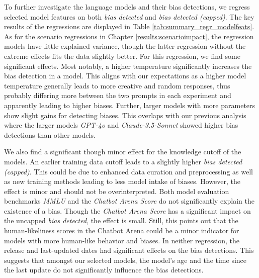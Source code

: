 \par To further investigate the language models and their bias detections, we regress selected model features on both \textit{bias detected} and \textit{bias detected (capped)}. The key results of the regressions are displayed in Table \ref{tab:summary_regr_modelfeats}. As for the scenario regressions in Chapter \ref{results:scenarioimpact}, the regression models have little explained variance, though the latter regression without the extreme effects fits the data slightly better. For this regression, we find some significant effects. Most notably, a higher temperature significantly increases the bias detection in a model. This aligns with our expectations as a higher model temperature generally leads to more creative and random responses, thus probably differing more between the two prompts in each experiment and apparently leading to higher biases. Further, larger models with more parameters show slight gains for detecting biases. This overlaps with our previous analysis where the larger models \textit{GPT-4o} and \textit{Claude-3.5-Sonnet} showed higher bias detections than other models.

\par We also find a significant though minor effect for the knowledge cutoff of the models. An earlier training data cutoff leads to a slightly higher \textit{bias detected (capped)}. This could be due to enhanced data curation and preprocessing as well as new training methods leading to less model intake of biases. However, the effect is minor and should not be overinterpreted. Both model evaluation benchmarks \textit{MMLU} and the \textit{Chatbot Arena Score} do not significantly explain the existence of a bias. Though the \textit{Chatbot Arena Score} has a significant impact on the uncapped \textit{bias detected}, the effect is small. Still, this points out that the human-likeliness scores in the Chatbot Arena could be a minor indicator for models with more human-like behavior and biases. In neither regression, the release and last-updated dates had significant effects on the bias detections. This suggests that amongst our selected models, the model's age and the time since the last update do not significantly influence the bias detections.
